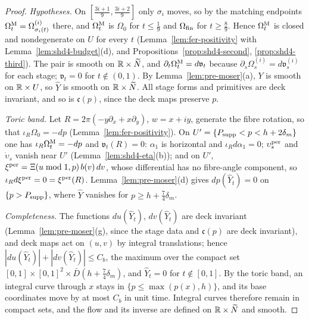 \begin{proof}
\emph{Hypotheses.} On $[\frac{3i+1}9,\frac{3i+2}9]$ only $\sigma_i$ moves, so by the matching endpoints $\Omega^{\rm M}_t=\Omega^{(i)}_{\sigma_i(t)}$
there, and $\Omega^{\rm M}_t$ is $\Omega_0$ for $t\le\frac19$ and $\Omega_{\rm fin}$ for $t\ge\frac89$. Hence $\Omega^{\rm M}_t$ is closed and
nondegenerate on $U$ for every $t$ (Lemma~\ref{lem:fer-positivity} with Lemma~\ref{lem:shd4-budget}(d), and
Propositions~\ref{prop:shd4-second}, \ref{prop:shd4-third}). The pair is smooth on $\mathbb{R}\times\widetilde N$, and $\partial_t\Omega^{\rm M}_t=d\mathfrak v_t$ because
$\partial_s\Omega^{(i)}_s=d\mathfrak v^{(i)}_s$ for each stage; $\mathfrak v_t=0$ for $t\notin(0,1)$. By
Lemma~\ref{lem:pre-moser}(a), $Y$ is smooth on $\mathbb{R}\times U$, so $\widehat Y$ is smooth on $\mathbb{R}\times\widetilde N$. All stage forms and
primitives are deck invariant, and so is $\mathfrak c(p)$, since the deck maps preserve $p$.

\emph{Toric band.} Let $R=2\pi(-y\partial_x+x\partial_y)$, $w=x+iy$, generate the fibre rotation, so that $\iota_R\Omega_0=-dp$
(Lemma~\ref{lem:fer-positivity}). On $U'=\{P_{\rm supp}<p<h+2\delta_m\}$ one has $\iota_R\Omega^{\rm M}_t=-dp$ and $\mathfrak v_t(R)=0$:
$\alpha_1$ is horizontal and $\iota_Rd\alpha_1=0$; $\upsilon^{\rm per}_s$ and $\dot\upsilon_s$ vanish near $U'$
(Lemma~\ref{lem:shd4-eta}(b)); and on $U'$, $\xi^{\rm per}=\Xi(u\bmod1,p)\,b(v)\,dv$, whose differential has no fibre-angle
component, so $\iota_Rd\xi^{\rm per}=0=\xi^{\rm per}(R)$. Lemma~\ref{lem:pre-moser}(d) gives $dp(\widehat Y_t)=0$ on $\{p>P_{\rm supp}\}$, where
$\widehat Y$ vanishes for $p\ge h+\frac74\delta_m$.

\emph{Completeness.} The functions $du(\widehat Y_t)$, $dv(\widehat Y_t)$ are deck invariant (Lemma~\ref{lem:pre-moser}(g), since the
stage data and $\mathfrak c(p)$ are deck invariant), and deck maps
act on $(u,v)$ by integral translations; hence $|du(\widehat Y_t)|+|dv(\widehat Y_t)|\le C_b$, the maximum over the compact set
$[0,1]\times[0,1]^2\times\bar D(h+\frac74\delta_m)$, and $\widehat Y_t=0$ for $t\notin[0,1]$. By the toric band, an integral curve
through $x$ stays in $\{p\le\max(p(x),h)\}$, and its base coordinates move by at most $C_b$ in unit time. Integral curves
therefore remain in compact sets, and the flow and its inverse are defined on $\mathbb{R}\times\widetilde N$ and smooth.


\end{proof}
